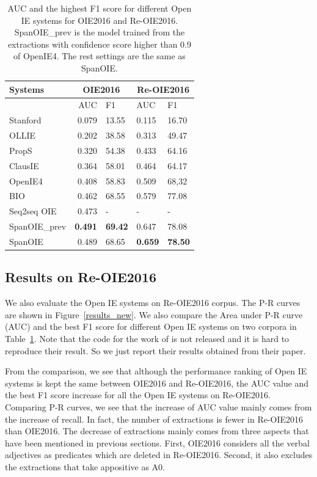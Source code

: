 \documentclass[letterpaper]{article} %
\begin{document}
\begin{table}[t!]
\begin{center}
\begin{tabular}{|l|rl|ll|}

\hline \textbf{Systems} & \multicolumn{2}{|c|}{\textbf{OIE2016}} & \multicolumn{2}{|c|}{\textbf{Re-OIE2016}} \\ \hline
& AUC & F1 &AUC &F1 \\
\hline
Stanford \cite{Angeli2015LeveragingLS} & 0.079 & 13.55& 0.115 & 16.70\\
OLLIE \cite{Mausam2012OpenLL} & 0.202 &38.58 & 0.313 & 49.47\\
PropS \cite{Stanovsky2016GettingMO} & 0.320 & 54.38& 0.433 & 64.16\\
ClausIE \cite{Corro2013ClausIECO} & 0.364 & 58.01& 0.464 & 64.17\\
OpenIE4 \cite{Mausam2016OpenIE} & 0.408 & 58.83& 0.509 & 68,32\\
\hline
BIO & 0.462 & 68.55 & 0.579 & 77.08\\
Seq2seq OIE \cite{Cui2018NeuralOI} & 0.473 & - & - & - \\
SpanOIE\_prev  &\textbf{0.491} & \textbf{69.42}& 0.647 & 78.08\\
SpanOIE & 0.489 & 68.65& \textbf{0.659} & \textbf{78.50}\\
\hline
\end{tabular}
\end{center}
\caption{\label{auc} AUC and the highest F1 score for different Open IE systems for OIE2016 and Re-OIE2016. SpanOIE\_prev is the model trained from the extractions with confidence score higher than 0.9 of OpenIE4. The rest settings are the same as SpanOIE.}
\end{table}

\subsection{Results on Re-OIE2016}
We also evaluate the Open IE systems on Re-OIE2016 corpus. The P-R curves are shown in Figure~\ref{results_new}. We also compare the Area under P-R curve (AUC) and the best F1 score for different Open IE systems on two corpora in Table~\ref{auc}. Note that the code for the work of \cite{Cui2018NeuralOI} is not released and it is hard to reproduce their result. So we just report their results obtained from their paper.

From the comparison, we see that although the performance ranking of Open IE systems is kept the same between OIE2016 and Re-OIE2016, the AUC value and the best F1 score increase for all the Open IE systems on Re-OIE2016. Comparing P-R curves, we see that the increase of AUC value mainly comes from the increase of recall. In fact, the number of extractions is fewer in Re-OIE2016 than OIE2016. The decrease of extractions mainly comes from three aspects that have been mentioned in previous sections. First, OIE2016 considers all the verbal adjectives as predicates which are deleted in Re-OIE2016. Second, it also excludes the extractions that take appositive as A0.
\end{document}
